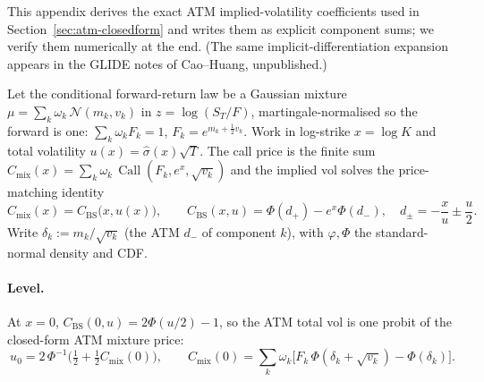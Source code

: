 \documentclass[11pt]{article}
\renewcommand{\Call}{\operatorname{Call}}
\newcommand{\cN}{\mathcal{N}}
\begin{document}
This appendix derives the exact ATM implied-volatility coefficients used in
Section~\ref{sec:atm-closedform} and writes them as explicit component sums; we verify them
numerically at the end. (The same implicit-differentiation expansion appears in the GLIDE
notes of Cao--Huang, unpublished.)

Let the conditional forward-return law be a Gaussian mixture
$\mu=\sum_k\omega_k\,\cN(m_k,v_k)$ in $z=\log(S_T/F)$, martingale-normalised so the forward is
one: $\sum_k\omega_k F_k=1$, $F_k=e^{m_k+\frac12 v_k}$. Work in log-strike $x=\log K$ and total
volatility $u(x)=\widehat\sigma(x)\sqrt{T}$. The call price is the finite sum
$C_{\mathrm{mix}}(x)=\sum_k\omega_k\,\Call(F_k,e^x,\sqrt{v_k})$ and the implied vol solves the
price-matching identity
\begin{equation}
C_{\mathrm{mix}}(x)=C_{\mathrm{BS}}\big(x,u(x)\big),\qquad
C_{\mathrm{BS}}(x,u)=\Phi(d_+)-e^x\Phi(d_-),\quad d_\pm=-\frac{x}{u}\pm\frac{u}{2}.
\label{eq:glide-identity}
\end{equation}
Write $\delta_k:=m_k/\sqrt{v_k}$ (the ATM $d_-$ of component $k$), with $\varphi,\Phi$ the
standard-normal density and CDF.

\paragraph{Level.} At $x=0$, $C_{\mathrm{BS}}(0,u)=2\Phi(u/2)-1$, so the ATM total vol is one
probit of the closed-form ATM mixture price:
\begin{equation}
u_0=2\,\Phi^{-1}\!\Big(\tfrac12+\tfrac12 C_{\mathrm{mix}}(0)\Big),\qquad
C_{\mathrm{mix}}(0)=\sum_k\omega_k\big[F_k\,\Phi(\delta_k+\sqrt{v_k})-\Phi(\delta_k)\big].
\label{eq:glide-level}
\end{equation}
\end{document}
